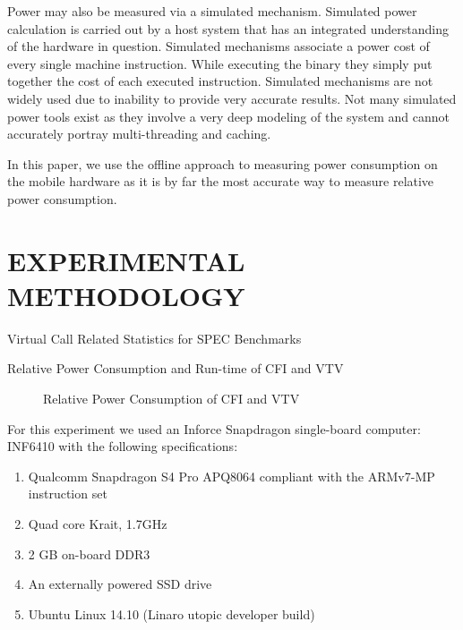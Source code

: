 \documentclass[letterpaper, 10 pt, conference]{ieeeconf}  %
\begin{document}
Power may also be measured via a simulated mechanism. Simulated power calculation is carried out by a host system that has an integrated understanding of the hardware in question. Simulated mechanisms associate a power cost of every single machine instruction. While executing the binary they simply put together the cost of each executed instruction. Simulated mechanisms are not widely used due to inability to provide very accurate results. Not many simulated power tools exist as they involve a very deep modeling of the system and cannot accurately portray multi-threading and caching.

In this paper, we use the offline approach to measuring power consumption on the mobile hardware as it is by far the most accurate way to measure relative power consumption.

\section{EXPERIMENTAL METHODOLOGY}

\begin{table*}[t]
\centering
\caption{Virtual Call Related Statistics for SPEC Benchmarks}
\label{spec}

\end{table*}

\begin{table*}
\centering
\caption{Relative Power Consumption and Run-time of CFI and VTV}
\label{results-table}

\end{table*}

\begin{figure}
\caption{Relative Power Consumption of CFI and VTV}
\label{fig-results-bar}

\end{figure}

For this experiment we used an Inforce Snapdragon single-board computer: INF6410 with the following specifications: 
\begin{enumerate}
\item Qualcomm Snapdragon S4 Pro APQ8064 compliant with the ARMv7-MP instruction set
\item Quad core Krait, 1.7GHz
\item 2 GB on-board DDR3
\item An externally powered SSD drive
\item Ubuntu Linux 14.10 (Linaro utopic developer build)
\end{enumerate}
\end{document}
